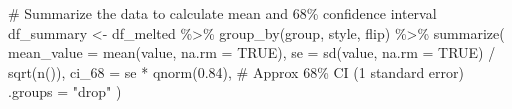 \documentclass[
  letterpaper,
  DIV=11,
  numbers=noendperiod]{scrartcl}
\newenvironment{Shaded}{\begin{snugshade}}{\end{snugshade}}
\newcommand{\AttributeTok}[1]{\textcolor[rgb]{0.40,0.45,0.13}{#1}}
\newcommand{\CommentTok}[1]{\textcolor[rgb]{0.37,0.37,0.37}{#1}}
\newcommand{\ConstantTok}[1]{\textcolor[rgb]{0.56,0.35,0.01}{#1}}
\newcommand{\FloatTok}[1]{\textcolor[rgb]{0.68,0.00,0.00}{#1}}
\newcommand{\FunctionTok}[1]{\textcolor[rgb]{0.28,0.35,0.67}{#1}}
\newcommand{\NormalTok}[1]{\textcolor[rgb]{0.00,0.23,0.31}{#1}}
\newcommand{\OtherTok}[1]{\textcolor[rgb]{0.00,0.23,0.31}{#1}}
\newcommand{\SpecialCharTok}[1]{\textcolor[rgb]{0.37,0.37,0.37}{#1}}
\newcommand{\StringTok}[1]{\textcolor[rgb]{0.13,0.47,0.30}{#1}}
\begin{document}
\begin{Shaded}
\begin{Highlighting}[]
  \CommentTok{\# Summarize the data to calculate mean and 68\% confidence interval}
\NormalTok{  df\_summary }\OtherTok{\textless{}{-}}\NormalTok{ df\_melted }\SpecialCharTok{\%\textgreater{}\%}
    \FunctionTok{group\_by}\NormalTok{(group, style, flip) }\SpecialCharTok{\%\textgreater{}\%}
    \FunctionTok{summarize}\NormalTok{(}
      \AttributeTok{mean\_value =} \FunctionTok{mean}\NormalTok{(value, }\AttributeTok{na.rm =} \ConstantTok{TRUE}\NormalTok{),}
      \AttributeTok{se =} \FunctionTok{sd}\NormalTok{(value, }\AttributeTok{na.rm =} \ConstantTok{TRUE}\NormalTok{) }\SpecialCharTok{/} \FunctionTok{sqrt}\NormalTok{(}\FunctionTok{n}\NormalTok{()), }
      \AttributeTok{ci\_68 =}\NormalTok{ se }\SpecialCharTok{*} \FunctionTok{qnorm}\NormalTok{(}\FloatTok{0.84}\NormalTok{),   }\CommentTok{\# Approx 68\% CI (1 standard error)}
      \AttributeTok{.groups =} \StringTok{"drop"}
\NormalTok{    )}
  

\end{Highlighting}
\end{Shaded}
\end{document}
